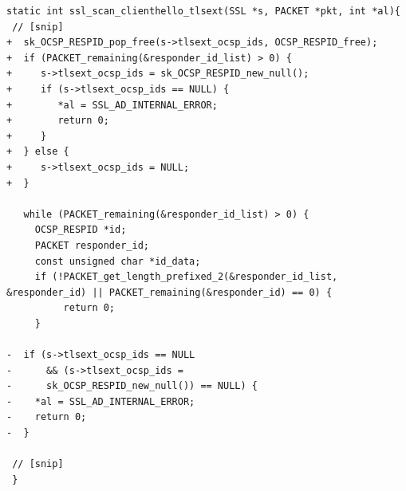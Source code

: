 \documentclass[10pt,conference]{IEEEtran}
\newcounter{lstannotation}
\begin{document}
\medskip
\setcounter{lstannotation}{0}
\begin{lstlisting}[style={CStyle}, caption={Fix provided by OpenSSL developers to the
\\CVE-2016-6304 vulnerability for file ssl/t1\_lib.c},label={lst:vuln}]
static int ssl_scan_clienthello_tlsext(SSL *s, PACKET *pkt, int *al){ 
 // [snip]
+  sk_OCSP_RESPID_pop_free(s->tlsext_ocsp_ids, OCSP_RESPID_free);
+  if (PACKET_remaining(&responder_id_list) > 0) {
+     s->tlsext_ocsp_ids = sk_OCSP_RESPID_new_null();
+     if (s->tlsext_ocsp_ids == NULL) {
+        *al = SSL_AD_INTERNAL_ERROR;
+        return 0;
+     }
+  } else {
+     s->tlsext_ocsp_ids = NULL;
+  }

   while (PACKET_remaining(&responder_id_list) > 0) {
     OCSP_RESPID *id;
     PACKET responder_id;
     const unsigned char *id_data;
     if (!PACKET_get_length_prefixed_2(&responder_id_list, &responder_id) || PACKET_remaining(&responder_id) == 0) {
          return 0;
     }

-  if (s->tlsext_ocsp_ids == NULL 
-      && (s->tlsext_ocsp_ids = 
-      sk_OCSP_RESPID_new_null()) == NULL) {
-    *al = SSL_AD_INTERNAL_ERROR;
-    return 0;
-  }

 // [snip]
 }
\end{lstlisting}
\end{document}
